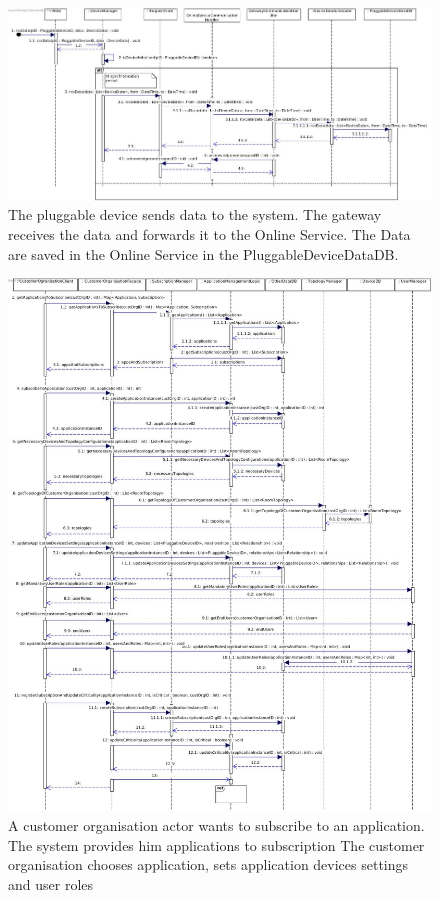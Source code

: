    \begin{figure}[!htp]
    	\centering
    	\includegraphics[width=\textwidth]{images/sequence-UC11}
    	\caption[Sensor data being processed by the system]{The pluggable device sends data to the system. The gateway receives the data and forwards it to the Online Service.
    	 The Data are saved in the Online Service in the PluggableDeviceDataDB. }\label{fig:seq_scenario1}
    \end{figure}

    \begin{figure}[!htp]
    	\centering
    	\includegraphics[width=\textwidth]{images/sequence-UC19}
    	\caption[ Subscribing to an application]{A customer organisation actor wants to subscribe to an application. The system provides him applications to subscription
    	                        The customer organisation chooses application, sets application devices settings and user roles }\label{fig:seq_scenario2}
    \end{figure}

